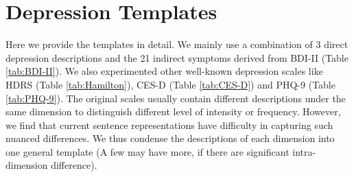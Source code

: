 \section{Depression Templates}

Here we provide the templates in detail. We mainly use a combination of 3 direct depression descriptions and the 21 indirect symptoms derived from BDI-II (Table \ref{tab:BDI-II}). We also experimented other well-known depression scales like HDRS (Table \ref{tab:Hamilton}), CES-D (Table \ref{tab:CES-D}) and PHQ-9 (Table \ref{tab:PHQ-9}). The original scales usually contain different descriptions under the same dimension to distinguish different level of intensity or frequency. However, we find that current sentence representations have difficulty in capturing such nuanced differences. We thus condense the descriptions of each dimension into one general template (A few may have more, if there are significant intra-dimension difference).

